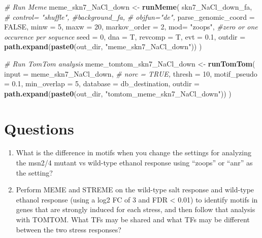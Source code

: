 \documentclass[
]{book}
\newenvironment{Shaded}{\begin{snugshade}}{\end{snugshade}}
\newcommand{\AttributeTok}[1]{\textcolor[rgb]{0.13,0.29,0.53}{#1}}
\newcommand{\CommentTok}[1]{\textcolor[rgb]{0.56,0.35,0.01}{\textit{#1}}}
\newcommand{\ConstantTok}[1]{\textcolor[rgb]{0.56,0.35,0.01}{#1}}
\newcommand{\DecValTok}[1]{\textcolor[rgb]{0.00,0.00,0.81}{#1}}
\newcommand{\FloatTok}[1]{\textcolor[rgb]{0.00,0.00,0.81}{#1}}
\newcommand{\FunctionTok}[1]{\textcolor[rgb]{0.13,0.29,0.53}{\textbf{#1}}}
\newcommand{\NormalTok}[1]{#1}
\newcommand{\OtherTok}[1]{\textcolor[rgb]{0.56,0.35,0.01}{#1}}
\newcommand{\StringTok}[1]{\textcolor[rgb]{0.31,0.60,0.02}{#1}}
\begin{document}
\begin{Shaded}
\begin{Highlighting}[]
\CommentTok{\# Run Meme}
\NormalTok{meme\_skn7\_NaCl\_down }\OtherTok{\textless{}{-}} \FunctionTok{runMeme}\NormalTok{(}
\NormalTok{  skn7\_NaCl\_down\_fa,}
  \CommentTok{\# control= "shuffle", \#background\_fa,}
  \CommentTok{\# objfun="de",}
  \AttributeTok{parse\_genomic\_coord =} \ConstantTok{FALSE}\NormalTok{,}
  \AttributeTok{minw =} \DecValTok{5}\NormalTok{,}
  \AttributeTok{maxw =} \DecValTok{20}\NormalTok{,}
  \AttributeTok{markov\_order =} \DecValTok{2}\NormalTok{,}
  \AttributeTok{mod=} \StringTok{"zoops"}\NormalTok{, }\CommentTok{\#zero or one occurence per sequence}
  \AttributeTok{seed =} \DecValTok{0}\NormalTok{,}
  \AttributeTok{dna =}\NormalTok{ T,}
  \AttributeTok{revcomp =}\NormalTok{ T,}
  \AttributeTok{evt =} \FloatTok{0.1}\NormalTok{,}
  \AttributeTok{outdir =} \FunctionTok{path.expand}\NormalTok{(}\FunctionTok{paste0}\NormalTok{(out\_dir, }\StringTok{"meme\_skn7\_NaCl\_down"}\NormalTok{))}
\NormalTok{)}

\CommentTok{\# Run TomTom analysis}
\NormalTok{meme\_tomtom\_skn7\_NaCl\_down }\OtherTok{\textless{}{-}} \FunctionTok{runTomTom}\NormalTok{(}
  \AttributeTok{input =}\NormalTok{ meme\_skn7\_NaCl\_down,}
  \CommentTok{\# norc = TRUE,}
  \AttributeTok{thresh =} \DecValTok{10}\NormalTok{,}
  \AttributeTok{motif\_pseudo =} \FloatTok{0.1}\NormalTok{,}
  \AttributeTok{min\_overlap =} \DecValTok{5}\NormalTok{,}
  \AttributeTok{database =}\NormalTok{ db\_destination,}
  \AttributeTok{outdir =} \FunctionTok{path.expand}\NormalTok{(}\FunctionTok{paste0}\NormalTok{(out\_dir, }\StringTok{"tomtom\_meme\_skn7\_NaCl\_down"}\NormalTok{))}
\NormalTok{  )}
\end{Highlighting}
\end{Shaded}

\hypertarget{questions-8}{%
\section{Questions}\label{questions-8}}

\begin{enumerate}
\def\labelenumi{\arabic{enumi}.}
\item
  What is the difference in motifs when you change the settings for
  analyzing the msn2/4 mutant vs wild-type ethanol response using
  ``zoops'' or ``anr'' as the setting?
\item
  Perform MEME and STREME on the wild-type salt response and wild-type
  ethanol response (using a log2 FC of 3 and FDR \textless{} 0.01) to identify
  motifs in genes that are strongly induced for each stress, and then
  follow that analysis with TOMTOM. What TFs may be shared and what
  TFs may be different between the two stress responses?
\end{enumerate}
\end{document}

